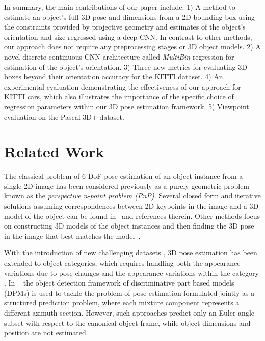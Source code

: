 \documentclass[10pt,twocolumn,letterpaper]{article}
\begin{document}
In summary, the main contributions of our paper include: 
1) A method to estimate an object's full 3D pose and dimensions from a 2D bounding box using the constraints provided by projective geometry and estimates of the object's orientation and size regressed using a deep CNN. In contrast to other methods, our approach does not require any preprocessing stages or 3D object models.
2) A novel discrete-continuous CNN architecture called \emph{MultiBin} regression for estimation of the object's orientation. 
3) Three new metrics for evaluating 3D boxes beyond their orientation accuracy for the KITTI dataset. 
4) An experimental evaluation demonstrating the effectiveness of our approach for KITTI cars, which also illustrates the importance of the specific choice of regression parameters within our 3D pose estimation framework.
5) Viewpoint evaluation on the Pascal 3D+ dataset.

\section{Related Work}
The classical problem of 6 DoF pose estimation of an object instance from a single 2D image has been considered previously as a purely geometric problem known as the \emph{perspective n-point problem (PnP)}. Several closed form and iterative solutions assuming correspondences between 2D keypoints in the image and a 3D model of the object can be found in~\cite{Lepetit09} and references therein. Other methods focus on constructing 3D models of the object instances and then finding the 3D pose in the image that best matches the model~\cite{Rothganger06,FerrariIJCV06}.

With the introduction of new challenging datasets \cite{KITTICVPR12,XiangSavareseWACV14,xiang2016objectnet3d,matzenICCV13}, 3D pose estimation has been extended to object categories, which requires handling both the appearance variations due to pose changes and the appearance variations within the category \cite{shapesKarTCM15,PepikCVPR15}. 
In ~\cite{PepikSchieleCVPR12, XiangSavareseWACV14} 
 the object detection framework of discriminative part based models (DPMs) is used to tackle the problem of pose estimation formulated jointly as a structured prediction problem, where each mixture component represents a different azimuth section. However, such approaches predict only an Euler angle subset with respect to the canonical object frame, while object dimensions and position are not estimated. 
 
\end{document}
